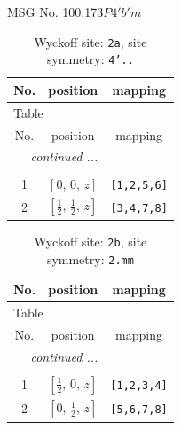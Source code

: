 \documentclass[fleqn,8pt]{jsarticle}
\begin{document}
\setcounter{MaxMatrixCols}{32}

\renewcommand{\tablename}{Table~}
\renewcommand{\figurename}{Figure~}
\begin{center}
\LARGE
MSG No. 100.173\quad$P4'b'm$
\end{center}
\renewcommand{\arraystretch}{1.2}
\begin{longtable}{ccc}
\caption{Wyckoff site: {\tt 2a}, site symmetry: {\tt 4'..}}
 \\
 \hline \hline
No. & position & mapping \\ \hline \endfirsthead

\multicolumn{2}{l}{\tablename\ \thetable{}} \\
 \hline \hline
No. & position & mapping \\ \hline \endhead

 \hline \hline
\multicolumn{2}{r}{\footnotesize\it continued ...} \\ \endfoot

 \hline \hline
\multicolumn{2}{r}{} \\ \endlastfoot

1 & $\left[ 0,\, 0,\, z \right]$ & {\tt [1,2,5,6]} \\ \hline
2 & $\left[ \frac{1}{2},\, \frac{1}{2},\, z \right]$ & {\tt [3,4,7,8]} \\
\end{longtable}
\renewcommand{\arraystretch}{1.2}
\begin{longtable}{ccc}
\caption{Wyckoff site: {\tt 2b}, site symmetry: {\tt 2.mm}}
 \\
 \hline \hline
No. & position & mapping \\ \hline \endfirsthead

\multicolumn{2}{l}{\tablename\ \thetable{}} \\
 \hline \hline
No. & position & mapping \\ \hline \endhead

 \hline \hline
\multicolumn{2}{r}{\footnotesize\it continued ...} \\ \endfoot

 \hline \hline
\multicolumn{2}{r}{} \\ \endlastfoot

1 & $\left[ \frac{1}{2},\, 0,\, z \right]$ & {\tt [1,2,3,4]} \\ \hline
2 & $\left[ 0,\, \frac{1}{2},\, z \right]$ & {\tt [5,6,7,8]} \\
\end{longtable}
\renewcommand{\arraystretch}{1.2}
\end{document}
